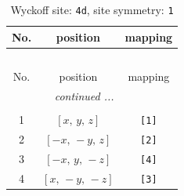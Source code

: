 \documentclass[fleqn,8pt]{jsarticle}
\begin{document}
\begin{longtable}{ccc}
\caption{Wyckoff site: {\tt 4d}, site symmetry: {\tt 1}}
 \\
 \hline \hline
No. & position & mapping \\ \hline \endfirsthead

\multicolumn{2}{l}{\tablename\ \thetable{}} \\
 \hline \hline
No. & position & mapping \\ \hline \endhead

 \hline \hline
\multicolumn{2}{r}{\footnotesize\it continued ...} \\ \endfoot

 \hline \hline
\multicolumn{2}{r}{} \\ \endlastfoot

1 & $\left[ x,\, y,\, z \right]$ & {\tt [1]} \\ \hline
2 & $\left[ - x,\, - y,\, z \right]$ & {\tt [2]} \\ \hline
3 & $\left[ - x,\, y,\, - z \right]$ & {\tt [4]} \\ \hline
4 & $\left[ x,\, - y,\, - z \right]$ & {\tt [3]} \\
\end{longtable}
\end{document}
